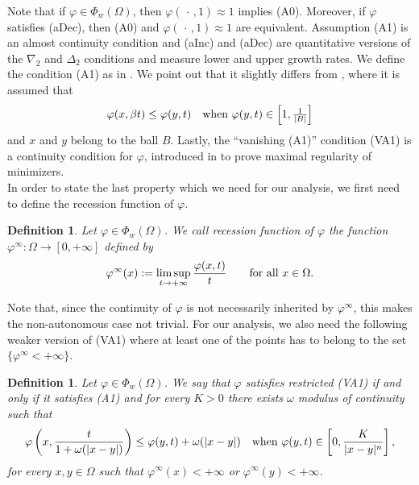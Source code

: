 \documentclass[a4paper,11pt,oneside,notitlepage]{article}
\newtheorem{definition}[theorem]{Definition}
\numberwithin{equation}{section}
\newcommand{\vphi}{\varphi}
\begin{document}
Note that if $\vphi \in \Phi_w(\Omega)$, then $\vphi(\, \cdot \, ,1) \approx 1$ implies (A0). Moreover, if $\vphi$ satisfies (aDec), then (A0) and $\vphi(\,\cdot\, ,1) \approx 1$ are equivalent. Assumption (A1) is an almost continuity condition and (aInc) and (aDec) are quantitative versions of the $\nabla_2$ and $\Delta_2$ conditions and measure lower and upper growth rates. We define the condition (A1) as in \cite{EHH}. We point out that it slightly differs from \cite{HaH, H15}, where it is assumed that 
\begin{equation*}
    \vphi(x,\beta t) \le \vphi(y,t) \quad \textnormal{when } \vphi(y, t) \in \left[1, \tfrac{1}{|B|}\right]
\end{equation*}
and $x$ and $y$ belong to the ball $B$. Lastly, the “vanishing (A1)” condition (VA1) is a continuity condition for $\vphi$, introduced in \cite{HOk} to prove maximal regularity of minimizers.
\\
In order to state the last property which we need for our analysis, we first need to define the recession function of $\vphi$.

\begin{definition}
\label{def:recession}
    Let $\vphi \in \Phi_w(\Omega)$. We call recession function of $\vphi$ the function $\vphi^\infty : \Omega \to [0,+\infty]$ defined by
    \begin{equation*}
        \vphi^\infty(x) := \limsup_{t \to +\infty} \frac{\vphi(x,t)}{t} \qquad \textnormal{for all } x \in \Omega.
    \end{equation*}
\end{definition}

Note that, since the continuity of $\vphi$ is not necessarily inherited by $\vphi^\infty$, this makes the non-autonomous case not trivial. For our analysis, we also need the following weaker version of (VA1) where at least one of the points has to belong to the set $\{\vphi^\infty < +\infty\}$.

\begin{definition}\label{restrVA1def}
    Let $\vphi \in \Phi_w(\Omega)$. We say that $\vphi$ satisfies restricted (VA1) if and only if it satisfies (A1) and for every $K > 0$ there exists $\omega$ modulus of continuity such that
    \begin{equation*}
            \vphi \left(x, \frac{t}{1 + \omega(|x-y|)}\right) \le \vphi(y,t) + \omega(|x-y|) \quad \textnormal{when } \vphi(y, t) \in \left[0, \frac{K}{|x-y|^n}\right],
        \end{equation*}
        for every $x,y \in \Omega$ such that $\vphi^\infty(x) < +\infty$ or $\vphi^\infty(y) < +\infty$.
\end{definition}
\end{document}
